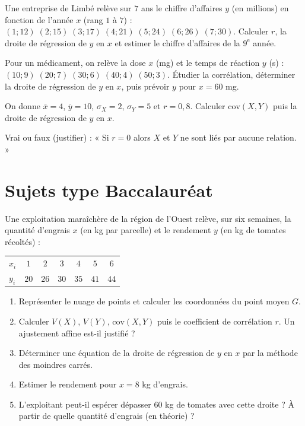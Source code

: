
\exo{} Une entreprise de Limbé relève sur $7$ ans le chiffre d'affaires $y$
(en millions) en fonction de l'année $x$ (rang $1$ à $7$) :
$(1;12)\;(2;15)\;(3;17)\;(4;21)\;(5;24)\;(6;26)\;(7;30)$. Calculer $r$, la droite de
régression de $y$ en $x$ et estimer le chiffre d'affaires de la $9^{\text{e}}$ année.

\exo{} Pour un médicament, on relève la dose $x$ (mg) et le temps de réaction $y$ (s) :
$(10;9)\;(20;7)\;(30;6)\;(40;4)\;(50;3)$. Étudier la corrélation, déterminer la droite de
régression de $y$ en $x$, puis prévoir $y$ pour $x=60$ mg.

\exo{} On donne $\bar x=4$, $\bar y=10$, $\sigma_X=2$, $\sigma_Y=5$ et $r=0{,}8$.
Calculer $\mathrm{cov}(X,Y)$ puis la droite de régression de $y$ en $x$.

\exo{} Vrai ou faux (justifier) : « Si $r=0$ alors $X$ et $Y$ ne sont liés par aucune
relation. »

\section{Sujets type Baccalauréat}

Une exploitation maraîchère de la région de l'Ouest relève, sur six semaines, la quantité
d'engrais $x$ (en kg par parcelle) et le rendement $y$ (en kg de tomates récoltés) :
\begin{center}\small
\begin{tabular}{@{}lcccccc@{}}
\toprule
$x_i$ & $1$ & $2$ & $3$ & $4$ & $5$ & $6$\\
$y_i$ & $20$ & $26$ & $30$ & $35$ & $41$ & $44$\\
\bottomrule
\end{tabular}
\end{center}
\begin{enumerate}[label=\arabic*)]
\item Représenter le nuage de points et calculer les coordonnées du point moyen $G$.
\item Calculer $V(X)$, $V(Y)$, $\mathrm{cov}(X,Y)$ puis le coefficient de corrélation $r$.
Un ajustement affine est-il justifié ?
\item Déterminer une équation de la droite de régression de $y$ en $x$ par la méthode des
moindres carrés.
\item Estimer le rendement pour $x=8$ kg d'engrais.
\item L'exploitant peut-il espérer dépasser $60$ kg de tomates avec cette droite ? À partir
de quelle quantité d'engrais (en théorie) ?
\end{enumerate}

